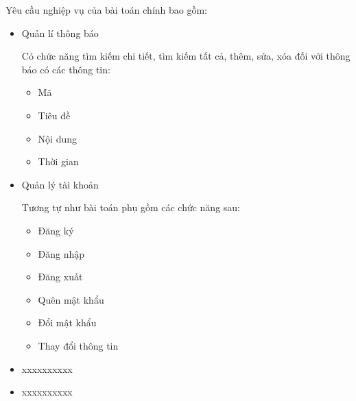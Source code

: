 Yêu cầu nghiệp vụ của bài toán chính bao gồm:

\begin{itemize}

    \item Quản lí thông báo

          Có chức năng tìm kiếm chi tiết, tìm kiếm tất cả, thêm, sửa, xóa đối với thông báo có các thông tin:

          \begin{itemize}

              \item Mã

              \item Tiêu đề

              \item Nội dung

              \item Thời gian

          \end{itemize}

    \item Quản lý tài khoản

          Tương tự như bài toán phụ gồm các chức năng sau:

          \begin{itemize}

              \item Đăng ký

              \item Đăng nhập

              \item Đăng xuất

              \item Quên mật khẩu

              \item Đổi mật khẩu

              \item Thay đổi thông tin

          \end{itemize}

    \item xxxxxxxxxx

    \item xxxxxxxxxx

\end{itemize}



